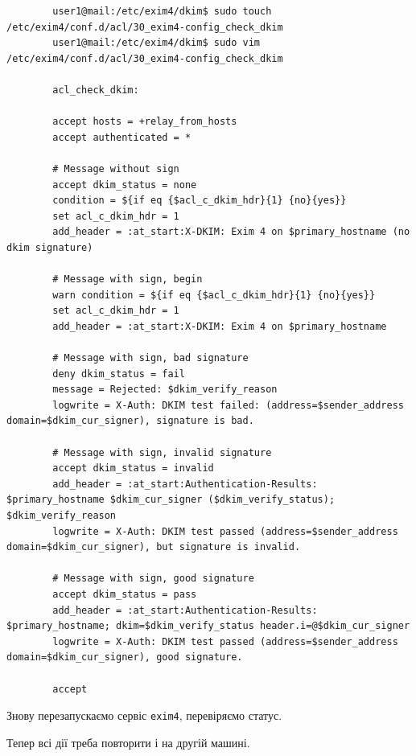 \documentclass[14pt, a4paper]{extreport}
\begin{document}
	\begin{verbatim}
		user1@mail:/etc/exim4/dkim$ sudo touch /etc/exim4/conf.d/acl/30_exim4-config_check_dkim
		user1@mail:/etc/exim4/dkim$ sudo vim /etc/exim4/conf.d/acl/30_exim4-config_check_dkim
		
		acl_check_dkim:
		
		accept hosts = +relay_from_hosts
		accept authenticated = *
		
		# Message without sign
		accept dkim_status = none
		condition = ${if eq {$acl_c_dkim_hdr}{1} {no}{yes}}
		set acl_c_dkim_hdr = 1
		add_header = :at_start:X-DKIM: Exim 4 on $primary_hostname (no dkim signature)
		
		# Message with sign, begin
		warn condition = ${if eq {$acl_c_dkim_hdr}{1} {no}{yes}}
		set acl_c_dkim_hdr = 1
		add_header = :at_start:X-DKIM: Exim 4 on $primary_hostname
		
		# Message with sign, bad signature
		deny dkim_status = fail
		message = Rejected: $dkim_verify_reason
		logwrite = X-Auth: DKIM test failed: (address=$sender_address domain=$dkim_cur_signer), signature is bad.
		
		# Message with sign, invalid signature
		accept dkim_status = invalid
		add_header = :at_start:Authentication-Results: $primary_hostname $dkim_cur_signer ($dkim_verify_status); $dkim_verify_reason
		logwrite = X-Auth: DKIM test passed (address=$sender_address domain=$dkim_cur_signer), but signature is invalid.
		
		# Message with sign, good signature
		accept dkim_status = pass
		add_header = :at_start:Authentication-Results: $primary_hostname; dkim=$dkim_verify_status header.i=@$dkim_cur_signer
		logwrite = X-Auth: DKIM test passed (address=$sender_address domain=$dkim_cur_signer), good signature.
		
		accept
	\end{verbatim}
	
	Знову перезапускаємо сервіс \texttt{exim4}, перевіряємо статус.
	
	Тепер всі дії треба повторити і на другій машині.
	
\end{document}

